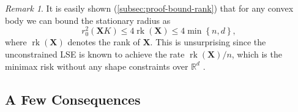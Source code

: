 \documentclass[a4paper]{article}
\newcommand{\mathset}[1]{\left\{#1\right\}}
\newcommand{\pr}[1]{\left(#1\right)}
\newcommand{\X}[0]{\mathbf{X}}
\newcommand{\RR}[0]{\mathbb{R}}
\newcommand{\rzero}[0]{r_{0}}
\DeclareMathOperator{\rankOp}{rk}
\newcommand{\rank}[1]{\rankOp\pr{#1}}
\theoremstyle{thmstyle}
\theoremstyle{defstyle}
\theoremstyle{remark}
\newtheorem{remark}{Remark}
\begin{document}
\begin{remark}
\label{rem:bound-rank}
It is easily shown (\cref{subsec:proof-bound-rank}) that for any convex body we can bound the stationary radius as
\begin{equation}
\label{eq:bound-rank}
    \rzero^2(\X K) \leq 4\rank{\X} \leq 4\min\mathset{n,d},
\end{equation}
where $\rank{\X}$ denotes the rank of $\X$.
This is unsurprising since the unconstrained LSE
is known to achieve the rate $\rank{\X}/n$, which is the minimax risk without any shape constraints over $\RR^d$ \citep[Example 15.14]{Wainwright2019}.
\end{remark}

\subsection{A Few Consequences}
\end{document}
